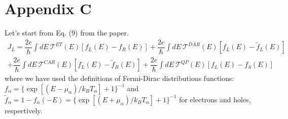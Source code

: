 \section{Appendix C}

Let's start from Eq. (9) from the paper. 
\begin{multline}\label{current}
J_{L}
=
\dfrac{2e}{\hbar}\int dE~\mathcal{T}^{ET}(E)[f_{L}(E)-f_{R}(E)]
+
\dfrac{2e}{\hbar}\int dE~\mathcal{T}^{DAR}(E)[f_{L}(E)-\tilde{f}_{L}(E)]
\\+
\dfrac{2e}{\hbar}\int dE~\mathcal{T}^{CAR}(E)[f_{L}(E)-\tilde{f}_{R}(E)]
+
\dfrac{2e}{\hbar}\int dE~\mathcal{T}^{QP}(E)[f_{L}(E)-f_{S}(E)]
\end{multline}
where we have used the definitions of Fermi-Dirac distributions functions: $f_{\alpha}=\{\exp[(E-\mu_{\alpha})/k_{B}T_{\alpha}]+1\}^{-1}$ and $\tilde{f}_{\alpha}=1-f_{\alpha}(-E)=\{\exp[(E+\mu_{\alpha})/k_{B}T_{\alpha}]+1\}^{-1}$ for electrons and holes, respectively.